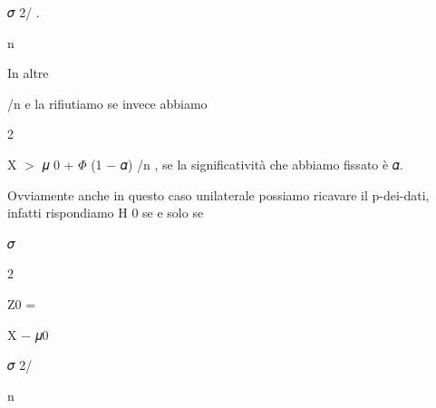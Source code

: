 \documentclass[a4paper,portrait,12pt]{article}
\begin{document}
\begin{flushleft}
𝜎 2/ .
\end{flushleft}


\begin{flushleft}
n
\end{flushleft}





\begin{flushleft}
In altre
\end{flushleft}





\begin{flushleft}
/n e la rifiutiamo se invece abbiamo
\end{flushleft}





2





\begin{flushleft}
X $>$ 𝜇 0 + $\Phi$ (1 $-$ 𝛼) /n , se la significativit\`{a} che abbiamo fissato \`{e} 𝛼.
\end{flushleft}


\begin{flushleft}
Ovviamente anche in questo caso unilaterale possiamo ricavare il p-dei-dati, infatti rispondiamo H 0 se e solo se
\end{flushleft}


\begin{flushleft}
𝜎
\end{flushleft}





2





\begin{flushleft}
Z0 =
\end{flushleft}





\begin{flushleft}
X $-$ 𝜇0
\end{flushleft}


\begin{flushleft}
𝜎 2/
\end{flushleft}


\begin{flushleft}
n
\end{flushleft}
\end{document}
